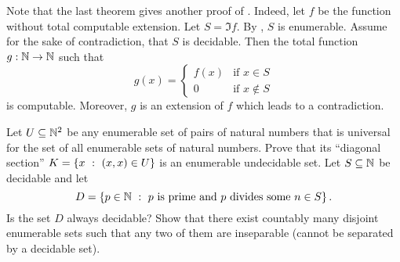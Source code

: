 Note that the last theorem gives another proof of
. Indeed, let $f$ be the function
without total computable extension. Let $S = \Im{f}$.
By ,
$S$ is enumerable. Assume for the sake of contradiction, that $S$ is decidable.
Then the total function $g : {\mathbb{N}} \to {\mathbb{N}}$ such that
\[
    g(x) =
    \begin{cases}
        f(x) & \text{if } x \in S \\
        0 & \text{if } x \notin S
    \end{cases}
\]
is computable. Moreover, $g$ is an extension of $f$ which leads to a
contradiction.

\begin{chapterendexercises}
    \exercise Let $U \subseteq {\mathbb{N}}^2$ be any enumerable set of pairs of
        natural numbers that is universal for the set of all
        enumerable sets of natural numbers.
        Prove that its ``diagonal section''
        $K = \set[(x, x) \in U]{x}$ is an enumerable undecidable set.
    \exercise Let $S \subseteq {\mathbb{N}}$ be decidable and let
        \[
            D =
            \set[
                p \text{ is prime and }
                p \text{ divides some } n \in S
            ]{p \in \N}.
        \]
        Is the set $D$ always decidable?
    \exercise Show that there exist countably many disjoint
        enumerable sets such that any two of them are inseparable
        (cannot be separated by a decidable set).
\end{chapterendexercises}
